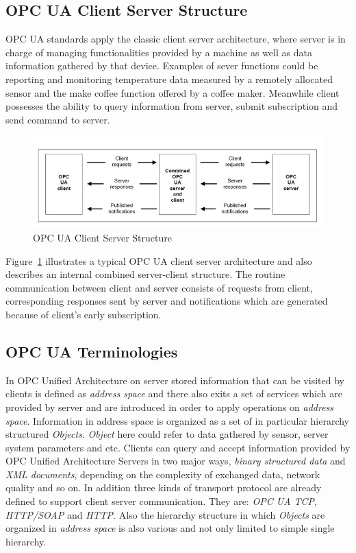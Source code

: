 \subsection{OPC UA Client Server Structure}
OPC UA standards apply the classic client server architecture, where server is in charge of managing functionalities provided by a machine as well as data information gathered by that device. Examples of sever functions could be reporting and monitoring temperature data measured by  a remotely allocated sensor and the make coffee function offered by a coffee maker. Meanwhile client possesses the ability to query information from server, submit subscription and send command to server.

\begin{figure}[!htbp]
	\centering
	\includegraphics[width=1.00\textwidth]{cs.jpg}
		\caption{OPC UA Client Server Structure\cite{O1}}
	\label{fig:cs}
\end{figure}
Figure~\ref{fig:cs} illustrates a typical OPC UA client server architecture and also describes an internal combined server-client structure. The routine communication between client and server consists of requests from client, corresponding responses sent by server and notifications which are generated because of client's early subscription.

\subsection{OPC UA Terminologies}
In OPC Unified Architecture on server stored information that can be visited by clients is defined as \emph{address space}\cite{O3} and there also exits a set of services\cite{O4} which are provided by server and are introduced in order to apply operations on \emph{address space}. Information in address space is organized as a set of in particular hierarchy structured \emph{Objects}. \emph{Object} here could refer to data gathered by sensor, server system parameters and etc. Clients can query and accept information provided by OPC Unified Architecture Servers in two major ways, \emph{binary structured data} and \emph{XML documents}, depending on the complexity of exchanged data, network quality and so on. In addition three kinds of transport protocol are already defined to support client server communication. They are: \emph{OPC UA TCP}, \emph{HTTP/SOAP} and \emph{HTTP}. Also the hierarchy structure in which \emph{Objects} are organized in \emph{address space} is also various and not only limited to simple single hierarchy.   


